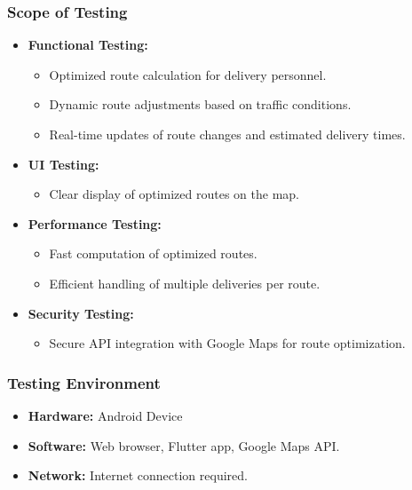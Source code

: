 \documentclass{article}
\begin{document}
\subsubsection{Scope of Testing}
\begin{itemize}
\item \textbf{Functional Testing:}
\begin{itemize}
\item Optimized route calculation for delivery personnel.
\item Dynamic route adjustments based on traffic conditions.
\item Real-time updates of route changes and estimated delivery times.
\end{itemize}
\item \textbf{UI Testing:}
\begin{itemize}
\item Clear display of optimized routes on the map.
\end{itemize}
\item \textbf{Performance Testing:}
\begin{itemize}
\item Fast computation of optimized routes.
\item Efficient handling of multiple deliveries per route.
\end{itemize}
\item \textbf{Security Testing:}
\begin{itemize}
\item Secure API integration with Google Maps for route optimization.
\end{itemize}
\end{itemize}

\subsubsection{Testing Environment}
\begin{itemize}
\item \textbf{Hardware:} Android Device
\item \textbf{Software:} Web browser, Flutter app, Google Maps API.
\item \textbf{Network:} Internet connection required.
\end{itemize}
\end{document}
